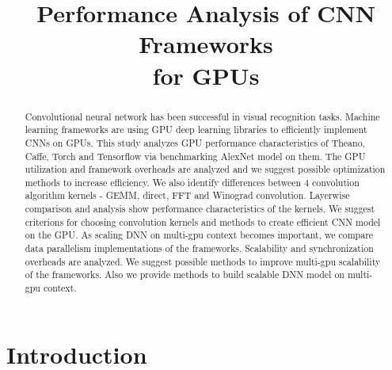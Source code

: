\documentclass[conference]{IEEEtran}
\begin{document}
\title{Performance Analysis of CNN Frameworks\\for GPUs}

\author{
\and
{}
}

\maketitle

\begin{abstract}
Convolutional neural network has been successful in visual recognition tasks.
Machine learning frameworks are using GPU deep learning libraries to efficiently implement CNNs on GPUs.
This study analyzes GPU performance characteristics of Theano, Caffe, Torch and Tensorflow via benchmarking AlexNet model on them.
The GPU utilization and framework overheads are analyzed and we suggest possible optimization methods to increase efficiency.
We also identify differences between 4 convolution algorithm kernels - GEMM, direct, FFT and Winograd convolution.
Layerwise comparison and analysis show performance characteristics of the kernels.
We suggest criterions for choosing convolution kernels and methods to create efficient CNN model on the GPU.
As scaling DNN on multi-gpu context becomes important, we compare data parallelism implementations of the frameworks.
Scalability and synchronization overheads are analyzed.
We suggest possible methods to improve multi-gpu scalability of the frameworks.
Also we provide methods to build scalable DNN model on multi-gpu context.

\end{abstract}

\IEEEpeerreviewmaketitle


\section{Introduction}
\end{document}

